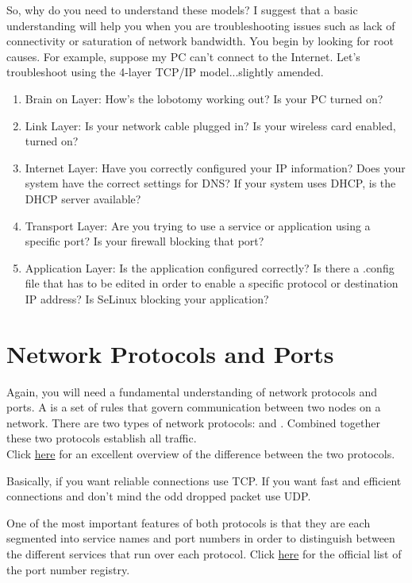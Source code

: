 So, why do you need to understand these models? I suggest that a basic understanding will help you when you are troubleshooting issues such as lack of connectivity or saturation of network bandwidth. You begin by looking for root causes. For example, suppose my PC can't connect to the Internet. Let's troubleshoot using the 4-layer TCP/IP model...slightly amended.

\begin{enumerate}[label=\textbf{Step \arabic*}]
	\item {Brain on Layer: How's the lobotomy working out? Is your PC turned on?}
	\item { Link Layer: Is your network cable plugged in? Is your wireless card enabled, turned on?}
	\item {Internet Layer: Have you correctly configured your IP information? Does your system have the correct settings for DNS? If your system uses DHCP, is the DHCP server available?} 
	\item {Transport Layer: Are you trying to use a service or application using a specific port? Is your firewall blocking that port?}
	\item {Application Layer: Is the application configured correctly? Is there a .config file that has to be edited in order to enable a specific protocol or destination IP address? Is SeLinux blocking your application?}
\end{enumerate}

\section{Network Protocols and Ports}

Again, you will need a fundamental understanding of network protocols and ports. A  is a set of rules that govern communication between two nodes on a network. There are two types of network protocols:  and . Combined together these two protocols establish all  traffic.\\

Click \href{http://www.diffen.com/difference/TCP\_vs\_UDP}{here} for an excellent overview of the difference between the two protocols.

Basically, if you want reliable connections use TCP. If you want fast and efficient connections and don't mind the odd dropped packet use UDP.

One of the most important features of both protocols is that they are each segmented into service names and port numbers in order to distinguish between the different services that run over each protocol.  Click \href{http://www.iana.org/assignments/service-names-port-numbers/service-names-port-numbers.xhtml}{here} for the official list of the port number registry.\\

